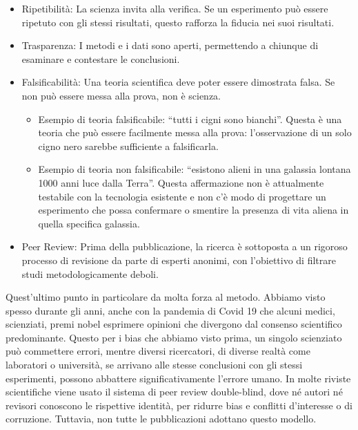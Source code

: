 \documentclass[12pt]{book} %
\begin{document}
\begin{itemize}
\item Ripetibilità: La scienza invita alla verifica. Se un esperimento può essere ripetuto con gli stessi risultati,
questo rafforza la fiducia nei suoi risultati.
\item Trasparenza: I metodi e i dati sono aperti, permettendo a chiunque di esaminare e contestare le conclusioni.
\item Falsificabilità: Una teoria scientifica deve poter essere dimostrata falsa. Se non può essere messa alla prova, non è scienza. 

\begin{itemize}
\item Esempio di teoria falsificabile: “tutti i cigni sono bianchi”. Questa è una teoria che può essere facilmente messa
alla prova: l'osservazione di un solo cigno nero sarebbe sufficiente a falsificarla.
\item Esempio di teoria non falsificabile: “esistono alieni in una galassia lontana 1000 anni luce dalla Terra”. Questa
affermazione non è attualmente testabile con la tecnologia esistente e non c'è modo di progettare
un esperimento che possa confermare o smentire la presenza di vita aliena in quella specifica galassia.
\end{itemize}
\item Peer Review: Prima della pubblicazione, la ricerca è sottoposta a un rigoroso processo di revisione da parte di
esperti anonimi, con l’obiettivo di filtrare studi metodologicamente deboli.
\end{itemize}
Quest'ultimo punto in particolare da molta forza al metodo. Abbiamo visto spesso durante gli anni,
anche con la pandemia di Covid 19 che alcuni medici, scienziati, premi nobel esprimere opinioni che divergono dal consenso scientifico predominante. Questo per i bias che abbiamo visto prima, un singolo scienziato può commettere errori, mentre
diversi ricercatori, di diverse realtà come laboratori o università, se arrivano alle stesse conclusioni con gli
stessi esperimenti, possono abbattere significativamente l'errore umano. In molte riviste scientifiche viene usato il sistema di peer review double-blind, dove né autori né revisori conoscono le rispettive identità, per ridurre bias e conflitti d’interesse o di corruzione. Tuttavia, non tutte le pubblicazioni adottano questo modello.
\end{document}
